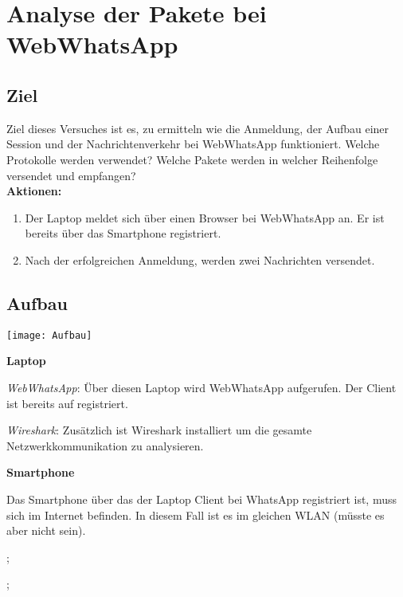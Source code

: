 \section{Analyse der Pakete bei WebWhatsApp}\label{sec:kaptiel}
\subsection{Ziel}
Ziel dieses Versuches ist es, zu ermitteln wie die Anmeldung, der Aufbau einer Session 
und der Nachrichtenverkehr bei WebWhatsApp funktioniert. Welche Protokolle werden
verwendet? Welche Pakete werden in welcher Reihenfolge versendet und empfangen?\\
\textbf{Aktionen:}
\begin{enumerate}
    \item Der Laptop meldet sich über einen Browser bei WebWhatsApp an. Er ist bereits über das Smartphone registriert.
    \item Nach der erfolgreichen Anmeldung, werden zwei Nachrichten versendet.
\end{enumerate}

\subsection{Aufbau}
\begin{center}
    \texttt{[image: Aufbau]}
\end{center}

\begin{description}
    \item \textbf{Laptop}
        \begin{description}
            \item \textit{WebWhatsApp}: 
                Über diesen Laptop wird WebWhatsApp aufgerufen. Der Client ist 
                bereits auf registriert. 
            \item \textit{Wireshark}:
                Zusätzlich ist Wireshark installiert um die gesamte Netzwerkkommunikation
                zu analysieren.
        \end{description}
    \item \textbf{Smartphone}
    \begin{description}
       \item Das Smartphone über das der Laptop Client bei WhatsApp registriert ist, muss
            sich im Internet befinden. In diesem Fall ist es im gleichen WLAN (müsste es aber nicht sein). 
    \end{description};
\end{description};

